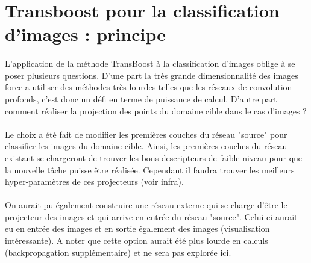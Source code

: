 \documentclass[11 pt]{article}
\begin{document}
\section{Transboost pour la classification d'images : principe}

\paragraph{}L’application de la méthode TransBoost à la classification d’images oblige à se poser plusieurs questions. D’une part la très grande dimensionnalité des images force a utiliser des méthodes très lourdes telles que les réseaux de convolution profonds, c'est donc un défi en terme de puissance de calcul. D’autre part comment réaliser la projection des points du domaine cible dans le cas d'images ?


\paragraph{} Le choix a été fait de modifier les premières couches du réseau "source" pour classifier les images du domaine cible. Ainsi, les premières couches du réseau existant se chargeront de trouver les bons descripteurs de faible niveau pour que la nouvelle tâche puisse être réalisée. Cependant il faudra trouver les meilleurs hyper-paramètres de ces projecteurs (voir infra).

\paragraph{} On aurait pu également construire une réseau externe qui se charge d'être le projecteur des images et qui arrive en entrée du réseau "source". Celui-ci aurait eu en entrée des images et en sortie également des images (visualisation intéressante). A noter que cette option aurait été plus lourde en calculs (backpropagation supplémentaire) et ne sera pas explorée ici.
\end{document}
